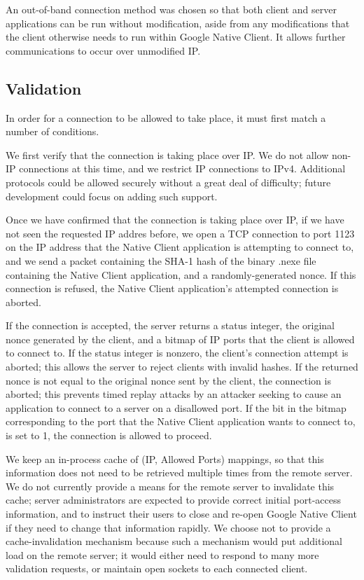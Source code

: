 \documentclass[a4paper,10pt]{article}
\begin{document}
An out-of-band connection method was chosen so that both client and server
applications can be run without modification, aside from any modifications that
the client otherwise needs to run within Google Native Client.  It allows
further communications to occur over unmodified IP.

\subsection{Validation}

In order for a connection to be allowed to take place, it must first match a
number of conditions.

We first verify that the connection is taking place over IP.  We do not allow
non-IP connections at this time, and we restrict IP connections to IPv4.
Additional protocols could be allowed securely without a great deal of
difficulty; future development could focus on adding such support.

Once we have confirmed that the connection is taking place over IP, if we have
not seen the requested IP addres before, we open a TCP connection to port 1123
on the IP address that the Native Client application is attempting to connect
to, and we send a packet containing the SHA-1 hash of the binary .nexe file
containing the Native Client application, and a randomly-generated nonce.  If
this connection is refused, the Native Client application's attempted connection
is aborted.

If the connection is accepted, the server returns a status integer, the
original nonce generated by the client, and a bitmap of IP ports that the
client is allowed to connect to.  If the status integer is nonzero, the
client's connection attempt is aborted; this allows the server to reject
clients with invalid hashes.  If the returned nonce is not equal to
the original nonce sent by the client, the connection is aborted; this
prevents timed replay attacks by an attacker seeking to cause an application
to connect to a server on a disallowed port.  If the bit in
the bitmap corresponding to the port that the Native Client application wants
to connect to, is set to 1, the connection is allowed to proceed.

We keep an in-process cache of (IP, Allowed Ports) mappings, so that this
information does not need to be retrieved multiple times from the remote
server.  We do not currently provide a means for the remote server to
invalidate this cache; server administrators are expected to provide correct
initial port-access information, and to instruct their users to close and
re-open Google Native Client if they need to change that information rapidly.
We choose not to provide a cache-invalidation mechanism because such a
mechanism would put additional load on the remote server; it would either need
to respond to many more validation requests, or maintain open sockets to each
connected client.
\end{document}
